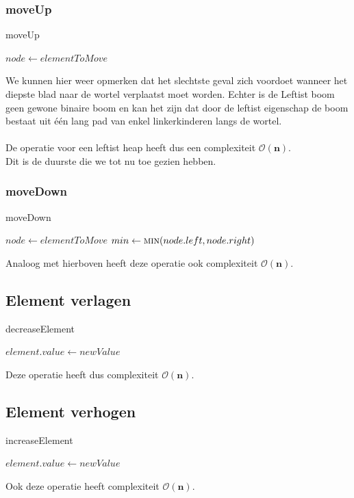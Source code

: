 \documentclass[a4paper,12pt]{report}
\newcommand{\bigO}[1]{$\bm{\mathcal{O}(#1)}$} %
\begin{document}
\subsubsection{moveUp}
\begin{algorithm}[H]
\caption{moveUp}
\SetAlgoLined	
\DontPrintSemicolon
$node \gets elementToMove$\;
\end{algorithm}
We kunnen hier weer opmerken dat het slechtste geval zich voordoet wanneer het diepste blad naar de wortel verplaatst moet worden.
Echter is de Leftist boom geen gewone binaire boom en kan het zijn dat door de leftist eigenschap de boom bestaat uit \'e\'en lang pad van enkel linkerkinderen langs de wortel. \\ \\
De  operatie voor een leftist heap heeft dus een complexiteit \bigO{n}. \\ 
Dit is de duurste  die we tot nu toe gezien hebben.

\subsubsection{moveDown}
\begin{algorithm}[H]
\caption{moveDown}
\SetAlgoLined	
\DontPrintSemicolon
$node \gets elementToMove$\;
$min \gets \Call{min}{node.left, node.right}$\;
\;
\;
\end{algorithm}
Analoog met hierboven heeft deze operatie ook complexiteit \bigO{n}. \\

\subsection{Element verlagen}
\begin{algorithm}[H]
\caption{decreaseElement}
\SetAlgoLined	
\DontPrintSemicolon
$element.value \gets newValue$\;
\end{algorithm}
Deze operatie heeft dus complexiteit \bigO{n}.

\subsection{Element verhogen}
\begin{algorithm}[H]
\caption{increaseElement}
\SetAlgoLined	
\DontPrintSemicolon
$element.value \gets newValue$\;
\;
\end{algorithm}
Ook deze operatie heeft complexiteit \bigO{n}.
\end{document}
